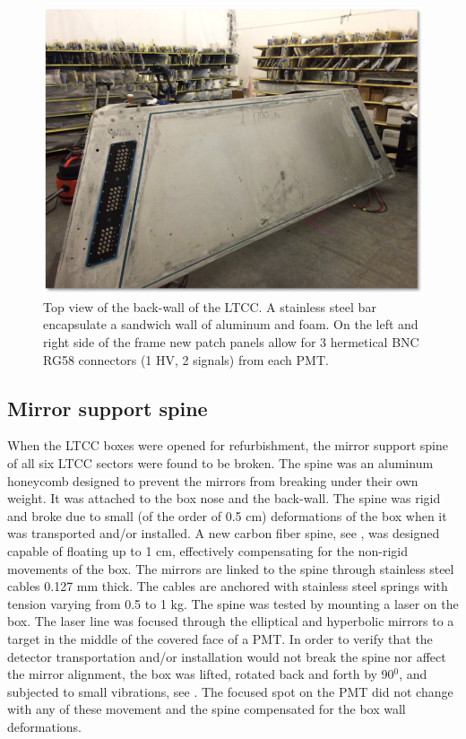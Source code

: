 \begin{figure}
	\centering
	\includegraphics[width=0.95\columnwidth,keepaspectratio]{img/backWall.png}
	\caption{Top view of the back-wall of the LTCC. A stainless steel bar encapsulate a sandwich wall of aluminum and foam. On the left and right side
            of the frame new patch panels allow for 3 hermetical BNC RG58 connectors (1 HV, 2 signals) from each PMT. }
	\label{fig:backWall}
\end{figure}


\subsection{Mirror support spine}

When the LTCC boxes were opened for refurbishment, the mirror support spine of all six LTCC sectors were found to be broken.
The spine was an aluminum honeycomb designed to prevent the mirrors from breaking under their own weight.
It was attached to the box nose and the back-wall. The spine was rigid and broke due to small
(of the order of 0.5 cm) deformations of the box when it was transported and/or installed.
A new carbon fiber spine, see , was designed capable of floating up to 1 cm, effectively compensating
for the non-rigid movements of the box.
The mirrors are linked to the spine through stainless steel cables 0.127 mm thick.
The cables are anchored with stainless steel springs with tension varying from 0.5 to 1 kg.
The spine was tested by mounting a laser on the box. The laser line was focused through the elliptical
and hyperbolic mirrors to a target in the middle of the covered face of a PMT.
In order to verify that the detector transportation and/or installation would not break the spine
nor affect the mirror alignment, the box was lifted, rotated back and forth by 90$^0$, and subjected
to small vibrations, see . The focused spot on the PMT did not change with any of these movement and the spine
compensated for the box wall deformations.

